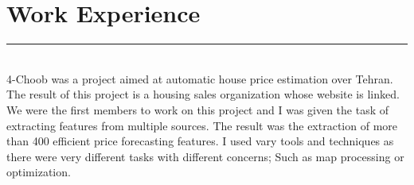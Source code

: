 \documentclass[]{rahulworld-resume}
\begin{document}
\begin{minipage}[t]{0.6\textwidth}
\section{Work Experience}
\noindent\rule{11.5cm}{0.4pt}
 
\noindent
\hspace{5em}%
\begin{minipage}{0.85\textwidth\vspace{2pt}}
	\vspace{3pt}\\
	4-Choob was a project aimed at automatic house price estimation over Tehran.
	The result of this project is a housing sales organization whose website is linked.
	We were the first members to work on this project and I was given the task of extracting features from multiple sources.
	The result was the extraction of more than 400 efficient price forecasting features.
	I used vary tools and techniques as there were very different tasks with different concerns;
	Such as map processing or optimization.\\
\end{minipage}

\end{minipage}
\end{document}
